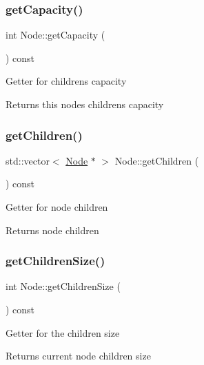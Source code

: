 \subsubsection{\texorpdfstring{get\+Capacity()}{getCapacity()}}
{\footnotesize\ttfamily int Node\+::get\+Capacity (\begin{DoxyParamCaption}{ }\end{DoxyParamCaption}) const}

Getter for childrens capacity \begin{DoxyReturn}{Returns}
this node\textquotesingle{}s childrens capacity 
\end{DoxyReturn}
\mbox{\label{classNode_a35d2158fc55fc34a4944bca1e4ca59bd}} 
\subsubsection{\texorpdfstring{get\+Children()}{getChildren()}}
{\footnotesize\ttfamily std\+::vector$<$ \hyperlink{classNode}{Node} $\ast$ $>$ Node\+::get\+Children (\begin{DoxyParamCaption}{ }\end{DoxyParamCaption}) const}

Getter for node children \begin{DoxyReturn}{Returns}
node children 
\end{DoxyReturn}
\mbox{\label{classNode_a8b2eb1a36124349b3c28cdd276a4a916}} 
\subsubsection{\texorpdfstring{get\+Children\+Size()}{getChildrenSize()}}
{\footnotesize\ttfamily int Node\+::get\+Children\+Size (\begin{DoxyParamCaption}{ }\end{DoxyParamCaption}) const}

Getter for the children size \begin{DoxyReturn}{Returns}
current node children size 
\end{DoxyReturn}
\mbox{\label{classNode_a3556d0ec8cd06e589d90f04b348bddd4}} 
